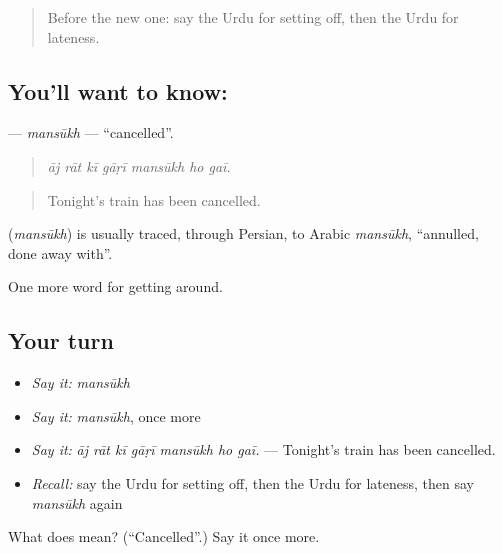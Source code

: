 \label{lesson:UR-C390-mansukh}



\begin{quote}
Before the new one: say the Urdu for setting off, then the Urdu for lateness.
\end{quote}

\subsection*{You'll want to know: }
\textbf{} — \emph{mansūkh} — \textquotedblleft{}cancelled\textquotedblright{}.

\begin{quote}
      
\end{quote}

\begin{quote}
\emph{āj rāt kī gāṛī mansūkh ho gaī.}
\end{quote}

\begin{quote}
Tonight's train has been cancelled.
\end{quote}

\begin{cousinweb}
\textbf{} (\emph{mansūkh}) is usually traced, through Persian, to Arabic \emph{mansūkh}, \textquotedblleft{}annulled, done away with\textquotedblright{}.
\end{cousinweb}

\begin{grammarlens}[title={What you've built}]
One more word for getting around.
\end{grammarlens}

\subsection*{Your turn}
\begin{itemize}
\raggedright
  \item \emph{Say it:} \emph{mansūkh}
  \item \emph{Say it:} \emph{mansūkh}, once more
  \item \emph{Say it:} \emph{āj rāt kī gāṛī mansūkh ho gaī.} — Tonight's train has been cancelled.
  \item \emph{Recall:} say the Urdu for setting off, then the Urdu for lateness, then say \emph{mansūkh} again
\end{itemize}

\begin{tcolorbox}[breakable,colback=teal!4,colframe=teal!35!black,title={Before you move on}]
What does  mean? (\textquotedblleft{}Cancelled\textquotedblright{}.) Say it once more.
\end{tcolorbox}

